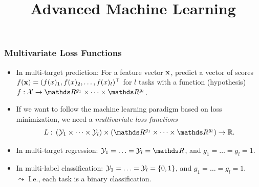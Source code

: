 \documentclass[11pt,compress,t,notes=noshow, xcolor=table]{beamer}
\title{Advanced Machine Learning}
\date{}
\begin{document}



\sloppy


\begin{frame}
	\frametitle{Multivariate Loss Functions}
	\begin{itemize}
%		
		\small
%		
		\item In multi-target prediction: For a feature vector $\mathbf{x}$, predict a vector of scores $f(\mathbf{x}) = (f(x)_1, f(x)_2, \ldots, f(x)_l)^\top$ for $l$ tasks with a function (hypothesis) $f: \Xspace \rightarrow \R^{g_1} \times \cdots \times \R^{g_l} $.
        \vspace{15pt}
%		
		\item If we want to follow the machine learning paradigm based on loss minimization, we need a \emph{multivariate loss functions} 
		$$
		L: \, (\Yspace_1 \times \cdots \times \Yspace_l) \times (\R^{g_1} \times \cdots \times \R^{g_l}) \rightarrow \mathbb{R}.
		$$ 
        \vspace{15pt}

        \item In multi-target regression: $\Yspace_1 = \ldots = \Yspace_l = \R$, and $g_1 = \ldots = g_l = 1$.
        \vspace{15pt}

        \item In multi-label classification: $\mathcal{Y}_1 =  \ldots = \mathcal{Y}_l = \{0, 1\}$, and $g_1 = \ldots = g_l = 1$. \\ $\leadsto$ I.e., each task is a binary classification.

%				
%		
%
	\end{itemize}
	
\end{frame}
\end{document}
